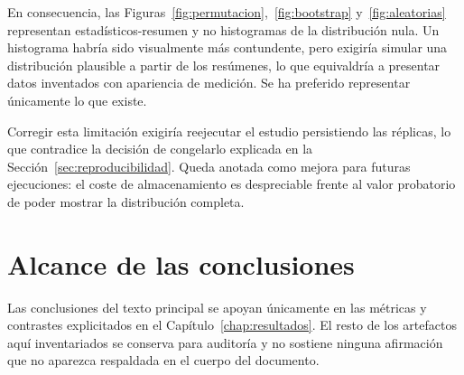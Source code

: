 En consecuencia, las Figuras~\ref{fig:permutacion},~\ref{fig:bootstrap} y~\ref{fig:aleatorias}
representan estadísticos-resumen y no histogramas de la distribución nula. Un histograma habría sido
visualmente más contundente, pero exigiría simular una distribución plausible a partir de los
resúmenes, lo que equivaldría a presentar datos inventados con apariencia de medición. Se ha
preferido representar únicamente lo que existe.

Corregir esta limitación exigiría reejecutar el estudio persistiendo las réplicas, lo que
contradice la decisión de congelarlo explicada en la Sección~\ref{sec:reproducibilidad}. Queda
anotada como mejora para futuras ejecuciones: el coste de almacenamiento es despreciable frente al
valor probatorio de poder mostrar la distribución completa.

\section{Alcance de las conclusiones}

Las conclusiones del texto principal se apoyan únicamente en las métricas y contrastes explicitados
en el Capítulo~\ref{chap:resultados}. El resto de los artefactos aquí inventariados se conserva para
auditoría y no sostiene ninguna afirmación que no aparezca respaldada en el cuerpo del documento.
